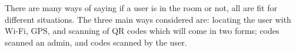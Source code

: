 \documentclass[]{report}   %
\begin{document}

There are many ways of saying if a user is in the room or not, all are fit for different situations. The three main ways considered are: locating the user with Wi-Fi, GPS, and scanning of QR codes which will come in two forms; codes scanned an admin, and codes scanned by the user.
\end{document}
